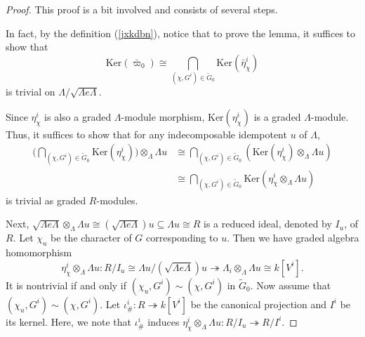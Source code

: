 \documentclass[10pt,a4paper]{amsart}
\begin{document}
\begin{proof}
This proof is a bit involved and
consists of several steps.

\vspace{2mm}


In fact, by the definition 
(\ref{jxkdbn}), notice that to 
prove the lemma,
it suffices to show that 
$$
\mathrm{Ker}(\bar{\varpi}_0) \cong \bigcap\limits_{(\chi, G^i) \in \tilde{G}_0}
 \mathrm{Ker}(\bar{\eta}^{i}_{\chi})	
$$	
is trivial on $\Lambda / \sqrt{\Lambda e \Lambda}$. 


Since $\eta^{i}_{\chi}$ is also a graded $\Lambda$-module morphism,
$\mathrm{Ker}(\eta^{i}_{\chi})$ is a graded $\Lambda$-module. Thus, it suffices to show that for any 
indecomposable idempotent $u$ of $\Lambda$, 
\begin{align}\label{qsxbd83}	
\Big(\bigcap\limits_{(\chi, G^i) \in \tilde{G}_0} \mathrm{Ker}(\eta^{i}_{\chi}) \Big)\otimes_{\Lambda} \Lambda u 
& \cong  \bigcap\limits_{(\chi, G^i) \in \tilde{G}_0} ( \mathrm{Ker}(\eta^{i}_{\chi}) 
\otimes_{\Lambda} \Lambda u ) \nonumber \\
 & \cong \bigcap\limits_{(\chi, G^i) \in \tilde{G}_0} \mathrm{Ker} (\eta^{i}_{\chi} 
 \otimes_{\Lambda} \Lambda u ) 
\end{align}
is trivial as graded $R$-modules. 

Next, $\sqrt{\Lambda e \Lambda} \otimes_{\Lambda} \Lambda u \cong (\sqrt{\Lambda e \Lambda} )u
\subseteq \Lambda u \cong R$ is a reduced ideal, denoted by $I_u$, of $R$.  
%
Let $\chi_u$ be the character of $G$ corresponding to $u$. 
Then we have graded algebra homomorphism $$\eta^{i}_{\chi} \otimes_{\Lambda} \Lambda u : 
R/I_u \cong \Lambda u \big/ (\sqrt{\Lambda e \Lambda} )u \twoheadrightarrow  \Lambda_i \otimes_{\Lambda} \Lambda u \cong k[V^i].$$
It is nontrivial if and only 
if $(\chi_u, G^i) \sim (\chi, G^i)$ in $\tilde{G}_0$. 
Now assume
that $(\chi_u, G^i) \sim (\chi, G^i)$. 
Let $\iota_{\#}^i : R \twoheadrightarrow k[V^i]$ be the canonical projection and $I^i$ be its kernel. 
Here, we note that
$\iota_{\#}^i$ induces $\eta^{i}_{\chi} 
\otimes_{\Lambda} \Lambda u : R/ I_u \twoheadrightarrow R/I^i$. 


\end{proof}
\end{document}
